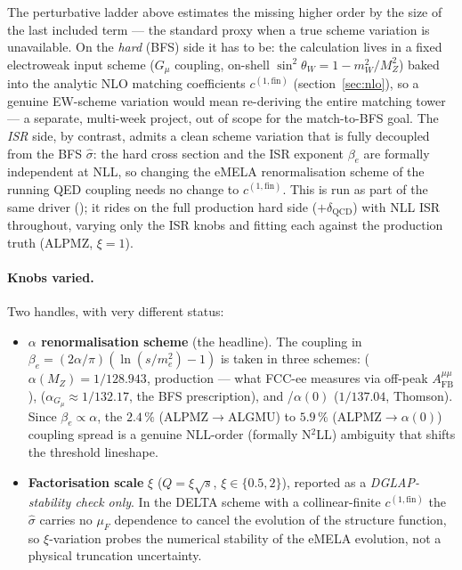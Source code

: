 \documentclass[11pt,a4paper]{article}
\newcommand{\code}[1]{\texttt{\detokenize{#1}}}
\newcommand{\mW}{m_W}
\begin{document}
The perturbative ladder above estimates the missing higher order by the
size of the last included term --- the standard proxy when a true scheme
variation is unavailable. On the \emph{hard} (BFS) side it has to be:
the calculation lives in a fixed electroweak input scheme ($G_\mu$
coupling, on-shell $\sin^2\theta_W=1-\mW^2/M_Z^2$) baked into the analytic
NLO matching coefficients $c^{(1,\text{fin})}$ (section~\ref{sec:nlo}),
so a genuine EW-scheme variation would mean re-deriving the entire
matching tower --- a separate, multi-week project, out of scope for the
match-to-BFS goal. The \emph{ISR} side, by contrast, admits a clean
scheme variation that is fully decoupled from the BFS $\hat\sigma$: the
hard cross section and the ISR exponent $\beta_e$ are formally independent
at NLL, so changing the eMELA renormalisation scheme of the running QED
coupling needs no change to $c^{(1,\text{fin})}$. This is run as part of
the same driver (\code{--theoryLadder}); it rides on the full production
hard side ($+\delta_\text{QCD}$) with NLL ISR throughout, varying only the
ISR knobs and fitting each against the production truth (ALPMZ, $\xi=1$).

\paragraph{Knobs varied.}
Two handles, with very different status:
\begin{itemize}\itemsep0pt
  \item \textbf{$\alpha$ renormalisation scheme} (the headline). The
  coupling in $\beta_e=(2\alpha/\pi)(\ln(s/m_e^2)-1)$ is taken in three
  schemes: \code{ALPMZ} ($\alpha(M_Z)=1/128.943$, production --- what
  FCC-ee measures via off-peak $A_\text{FB}^{\mu\mu}$), \code{ALGMU}
  ($\alpha_{G_\mu}\!\approx\!1/132.17$, the BFS prescription), and
  \code{FIXED}/$\alpha(0)$ ($1/137.04$, Thomson). Since $\beta_e\propto
  \alpha$, the $2.4\,\%$ (ALPMZ$\to$ALGMU) to $5.9\,\%$
  (ALPMZ$\to\alpha(0)$) coupling spread is a genuine NLL-order (formally
  N$^2$LL) ambiguity that shifts the threshold lineshape.
  \item \textbf{Factorisation scale} $\xi$ ($Q=\xi\sqrt s$,
  $\xi\in\{0.5,2\}$), reported as a \emph{DGLAP-stability check only}.
  In the DELTA scheme with a collinear-finite $c^{(1,\text{fin})}$ the
  $\hat\sigma$ carries no $\mu_F$ dependence to cancel the evolution of
  the structure function, so $\xi$-variation probes the numerical
  stability of the eMELA evolution, not a physical truncation
  uncertainty.
\end{itemize}
\end{document}
